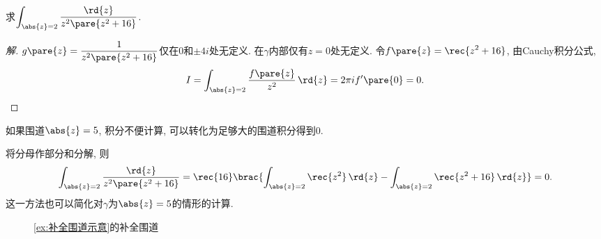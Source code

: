 \documentclass[../ComplexVariable.tex]{subfiles}
\begin{document}
\begin{sample}
    \begin{ex}
        求$\displaystyle \int_{\abs{z}=2} \frac{\rd{z}}{z^2\pare{z^2+16}}$.
    \end{ex}
    \begin{proof}[解]
        $\displaystyle g\pare{z} = \frac{1}{z^2\pare{z^2+16}}$仅在$0$和$\pm 4i$处无定义. 在$\gamma$内部仅有$z=0$处无定义. 令$f\pare{z} = \displaystyle \rec{z^2+16}$, 由Cauchy积分公式,
        \[ I = \int_{\abs{z} = 2} \frac{f\pare{z}}{z^2}\,\rd{z} = 2\pi i f'\pare{0} = 0. \qedhere \]
    \end{proof}
\end{sample}
\begin{remark}
    如果围道$\abs{z}=5$, 积分不便计算, 可以转化为足够大的围道积分得到$0$.
\end{remark}
\begin{remark}
    将分母作部分和分解, 则
    \[ \int_{\abs{z} = 2} \frac{\rd{z}}{z^2\pare{z^2+16}} = \rec{16} \brac{\int_{\abs{z}=2} \rec{z^2}\,\rd{z} - \int_{\abs{z}=2} \rec{z^2+16}\,\rd{z}} = 0. \]
    这一方法也可以简化对$\gamma$为$\abs{z}=5$的情形的计算.
\end{remark}
\begin{figure}
    \centering
    \caption{\cref{ex:补全围道示意}的补全围道}
    \label{fig:补全围道1}
\end{figure}
\end{document}
